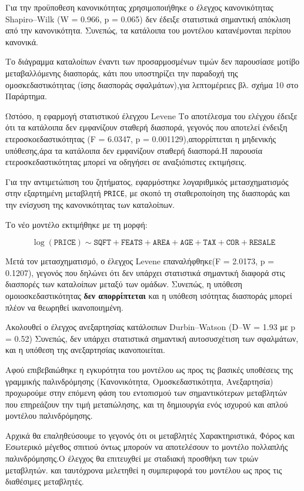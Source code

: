 \documentclass[
  10pt,
]{article}
\begin{document}
Για την προϋποθεση κανονικότητας χρησιμοποιήθηκε ο έλεγχος κανονικότητας
Shapiro--Wilk (W = 0.966, p = 0.065) δεν έδειξε στατιστικά σημαντική
απόκλιση από την κανονικότητα. Συνεπώς, τα κατάλοιπα του μοντέλου
κατανέμονται περίπου κανονικά.

Το διάγραμμα καταλοίπων έναντι των προσαρμοσμένων τιμών δεν παρουσίασε
μοτίβο μεταβαλλόμενης διασποράς, κάτι που υποστηρίζει την παραδοχή της
ομοσκεδαστικότητας (ίσης διασποράς σφαλμάτων),για λεπτομέρειες βλ. σχήμα
10 στο Παράρτημα.

Ωστόσο, η εφαρμογή στατιστικού έλεγχου Levene Το αποτέλεσμα του ελέγχου
έδειξε ότι τα κατάλοιπα δεν εμφανίζουν σταθερή διασπορά, γεγονός που
αποτελεί ένδειξη ετεροσκοεδαστικότητας (F = 6.0347, p =
0.001129),απορρίπτεται η μηδενικής υπόθεσης,άρα τα κατάλοιπα δεν
εμφανίζουν σταθερή διασπορά.Η παρουσία ετεροσκεδαστικότητας μπορεί να
οδηγήσει σε αναξιόπιστες εκτιμήσεις.

Για την αντιμετώπιση του ζητήματος, εφαρμόστηκε λογαριθμικός
μετασχηματισμός στην εξαρτημένη μεταβλητή \texttt{PRICE}, με σκοπό τη
σταθεροποίηση της διασποράς και την ενίσχυση της κανονικότητας των
καταλοίπων.

Το νέο μοντέλο εκτιμήθηκε με τη μορφή:

\[
\log(\texttt{PRICE}) \sim \texttt{SQFT} + \texttt{FEATS} + \texttt{AREA} + \texttt{AGE} + \texttt{TAX} + \texttt{COR} + \texttt{RESALE}
\]

Μετά τον μετασχηματισμό, ο έλεγχος Levene επαναλήφθηκε(F = 2.0173, p =
0.1207), γεγονός που δηλώνει ότι δεν υπάρχει στατιστικά σημαντική
διαφορά στις διασπορές των καταλοίπων μεταξύ των ομάδων. Συνεπώς, η
υπόθεση ομοιοσκεδαστικότητας \textbf{δεν απορρίπτεται} και η υπόθεση
ισότητας διασποράς μπορεί πλέον να θεωρηθεί ικανοποιημένη.

Ακολουθεί ο έλεγχος ανεξαρτησίας κατάλοιπων Durbin--Watson (D--W = 1.93
με p = 0.52) Συνεπώς, δεν υπάρχει στατιστικά σημαντική αυτοσυσχέτιση των
σφαλμάτων, και η υπόθεση της ανεξαρτησίας ικανοποιείται.

Αφού επιβεβαιώθηκε η εγκυρότητα του μοντέλου ως προς τις βασικές
υποθέσεις της γραμμικής παλινδρόμησης (Κανονικότητα, Ομοσκεδαστικότητα,
Ανεξαρτησία) προχωρούμε στην επόμενη φάση του εντοπισμού των
σημαντικότερων μεταβλητών που επηρεάζουν την τιμή μεταπώλησης, και τη
δημιουργία ενός ισχυρού και απλού μοντέλου παλινδρόμησης.

Αρχικά θα επαληθεύσουμε το γεγονός ότι οι μεταβλητές Χαρακτηριστικά,
Φόρος και Εσωτερικό μέγεθος σπιτιού όντως μπορούν να αποτελέσουν το
μοντέλο πολλαπλής παλινδρόμησης.Ο έλεγχος θα επιτευχθεί με σταδιακή
προσθήκη των τριών μεταβλητών. και ταυτόχρονα μελετηθεί η συμπεριφορά
του μοντέλου ως προς τις διαθέσιμες μεταβλητές.
\end{document}
